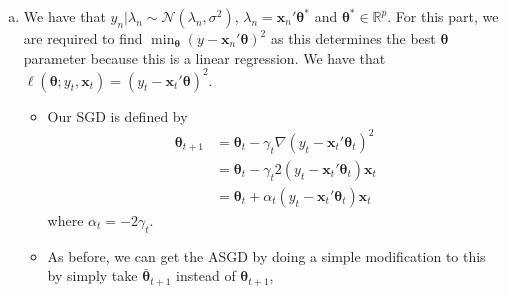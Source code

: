 \documentclass[letterpaper,10pt]{amsart}
\newcommand{\sR}{\mathbb{R}}
\begin{document}
\begin{enumerate}[1.]
\begin{enumerate}[(a)]
\item
We have that $y_n | \lambda_n \sim \mathcal{N}(\lambda_n, \sigma^2)$, $\lambda_n = \boldsymbol x_n' \boldsymbol \theta^*$ and $\boldsymbol \theta^* \in \sR^p$.
For this part, we are required to find $\min_{\boldsymbol \theta} (y - \boldsymbol x_n' \boldsymbol \theta)^2$ as this determines the best $\boldsymbol \theta$ parameter because this is a linear regression. We have that $\ell(\boldsymbol \theta;y_t, \boldsymbol x_t) = (y_t  - \boldsymbol x_t' \boldsymbol \theta)^2$. 


\begin{itemize}
\item
Our SGD is defined by
\begin{align*}
\boldsymbol \theta_{t+1} &= \boldsymbol \theta_t - \gamma_t \nabla (y_t - \boldsymbol x_t'\boldsymbol \theta_t)^2\\
&= \boldsymbol \theta_t - \gamma_t 2(y_t - \boldsymbol  x_t' \boldsymbol \theta_t) \boldsymbol x_t\\
&= \boldsymbol \theta_t + \alpha_t (y_t - \boldsymbol x_t' \boldsymbol \theta_t)\boldsymbol x_t
\end{align*}
where $\alpha_t = -2\gamma_t$.


\item

As before, we can get the ASGD by doing a simple modification to this by simply take $\bar{\boldsymbol \theta}_{t+1}$ instead of $\boldsymbol \theta_{t+1}$,


\end{itemize}
\end{enumerate}
\end{enumerate}
\end{document}
